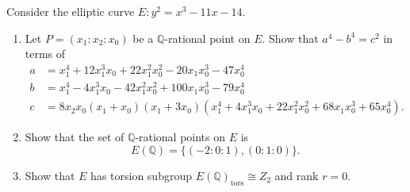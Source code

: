 \documentclass[12 pt, letterpaper]{hmcpset}
\begin{document}
\pagebreak

\begin{problem}[Problem 3.]
	Consider the elliptic curve $E : y^{2} = x^{3} - 11 x - 14$.
	\begin{enumerate}
		\item Let $P = (x_{1} : x_{2} : x_{0})$ be a $\mathbb{Q}$-rational point on $E$. Show that $a^{4} - b^{4} = c^{2}$ in terms of
			\[
				\begin{split}
					a & = x_{1}^{4} + 12 x_{1}^{3} x_{0} + 22 x_{1}^{2} x_{0}^{2} - 20 x_{1} x_{0}^{3} - 47 x_{0}^{4} \\
					b & = x_{1}^{4} - 4 x_{1}^{3} x_{0} - 42 x_{1}^{2} x_{0}^{2} + 100 x_{1} x_{0}^{3} - 79 x_{0}^{4} \\
					c & = 8 x_{2} x_{0} (x_{1} + x_{0})(x_{1} + 3 x_{0})(x_{1}^{4} + 4 x_{1}^{3} x_{0} + 22 x_{1}^{2} x_{0}^{2} + 68 x_{1} x_{0}^{3} + 65 x_{0}^{4}).
				\end{split}
			\]
		\item Show that the set of $\mathbb{Q}$-rational points on $E$ is
			\[
				E(\mathbb{Q}) = \{ (-2 : 0 : 1), (0 : 1 : 0) \}.
			\]
		\item Show that $E$ has torsion subgroup $E(\mathbb{Q})_{\text{tors}} \cong Z_{2}$ and rank $r = 0$.
	\end{enumerate}
\end{problem}
\end{document}
